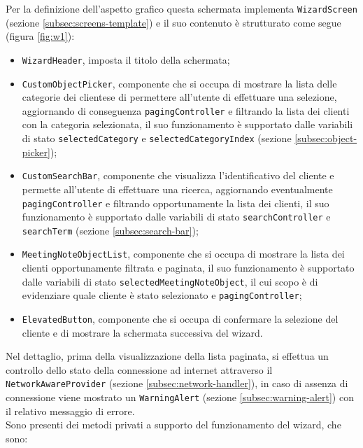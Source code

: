 Per la definizione dell'aspetto grafico questa schermata implementa \lstinline{WizardScreen} (sezione \ref{subsec:screens-template}) e il suo contenuto è strutturato come segue (figura \ref{fig:w1}):
\begin{itemize}
    \item \lstinline{WizardHeader}, imposta il titolo della schermata;
    \item \lstinline{CustomObjectPicker}, componente che si occupa di mostrare la lista delle categorie dei \glspl{cliente}\glsoccur e di permettere all'utente di effettuare una selezione, aggiornando di conseguenza \lstinline{pagingController} e filtrando la lista dei clienti con la categoria selezionata, il suo funzionamento è supportato dalle variabili di stato \lstinline{selectedCategory} e \lstinline{selectedCategoryIndex} (sezione \ref{subsec:object-picker});
    \item \lstinline{CustomSearchBar}, componente che visualizza l'identificativo del cliente e permette all'utente di effettuare una ricerca, aggiornando eventualmente \lstinline{pagingController} e filtrando opportunamente la lista dei clienti, il suo funzionamento è supportato dalle variabili di stato \lstinline{searchController} e \lstinline{searchTerm} (sezione \ref{subsec:search-bar});
    \item \lstinline{MeetingNoteObjectList}, componente che si occupa di mostrare la lista dei clienti opportunamente filtrata e paginata, il suo funzionamento è supportato dalle variabili di stato \lstinline{selectedMeetingNoteObject}, il cui scopo è di evidenziare quale cliente è stato selezionato e \lstinline{pagingController};
    \item \lstinline{ElevatedButton}\cite{site:elevated-button}, componente che si occupa di confermare la selezione del cliente e di mostrare la schermata successiva del \gls{wizard}\glsoccur.
\end{itemize}
Nel dettaglio, prima della visualizzazione della lista paginata, si effettua un controllo dello stato della connessione ad internet attraverso il \lstinline{NetworkAwareProvider} (sezione \ref{subsec:network-handler}), in caso di assenza di connessione viene mostrato un \lstinline{WarningAlert} (sezione \ref{subsec:warning-alert}) con il relativo messaggio di errore. \\
Sono presenti dei metodi privati a supporto del funzionamento del \gls{wizard}\glsoccur, che sono:
